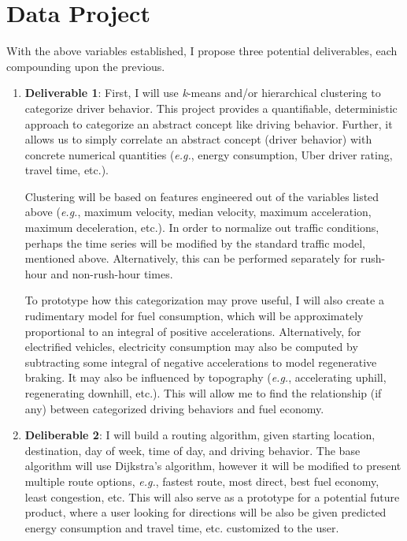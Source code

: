 \documentclass[12pt]{article}
\begin{document}
\section{Data Project}

With the above variables established, I propose three potential deliverables, each compounding upon the previous.

\begin{enumerate}

\item \textbf{Deliverable 1}: First, I will use \textit{k}-means and/or hierarchical clustering to categorize driver behavior. This project provides a quantifiable, deterministic approach to categorize an abstract concept like driving behavior. Further, it allows us to simply correlate an abstract concept (driver behavior) with concrete numerical quantities (\textit{e.g.}, energy consumption, Uber driver rating, travel time, etc.).

Clustering will be based on features engineered out of the variables listed above (\textit{e.g.}, maximum velocity, median velocity, maximum acceleration, maximum deceleration, etc.). In order to normalize out traffic conditions, perhaps the time series will be modified by the standard traffic model, mentioned above. Alternatively, this can be performed separately for rush-hour and non-rush-hour times.

To prototype how this categorization may prove useful, I will also create a rudimentary model for fuel consumption, which will be approximately proportional to an integral of positive accelerations. Alternatively, for electrified vehicles, electricity consumption may also be computed by subtracting some integral of negative accelerations to model regenerative braking. It may also be influenced by topography (\textit{e.g.}, accelerating uphill, regenerating downhill, etc.). This will allow me to find the relationship (if any) between categorized driving behaviors and fuel economy.

\item \textbf{Deliberable 2}: I will build a routing algorithm, given starting location, destination, day of week, time of day, and driving behavior. The base algorithm will use Dijkstra's algorithm, however it will be modified to present multiple route options, \textit{e.g.}, fastest route, most direct, best fuel economy, least congestion, etc. This will also serve as a prototype for a potential future product, where a user looking for directions will be also be given predicted energy consumption and travel time, etc. customized to the user.


\end{enumerate}
\end{document}
